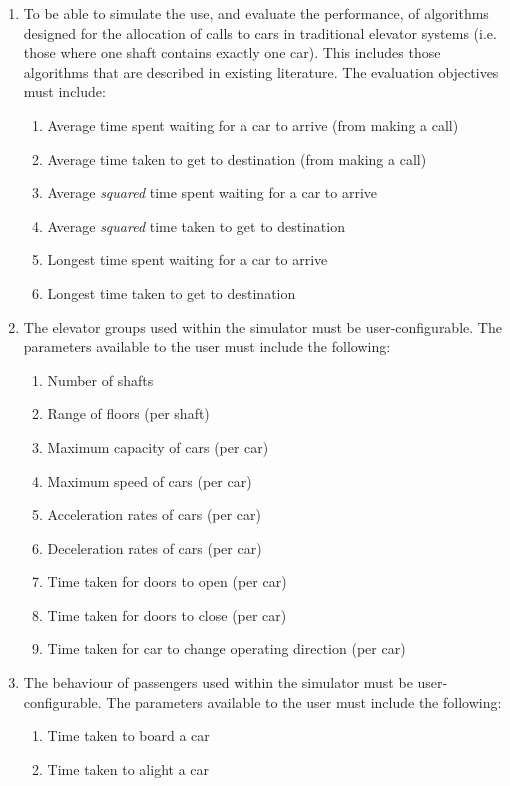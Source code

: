 \documentclass{UoYCSproject}
\begin{document}
	\begin{enumerate}
		\item To be able to simulate the use, and evaluate the performance, of algorithms designed for the allocation of calls to cars in traditional elevator systems (i.e. those where one shaft contains exactly one car).  This includes those algorithms that are described in existing literature.  The evaluation objectives must include:
		\begin{enumerate}
			\item Average time spent waiting for a car to arrive (from making a call)
			\item Average time taken to get to destination (from making a call)
			\item Average \textit{squared} time spent waiting for a car to arrive
			\item Average \textit{squared} time taken to get to destination
			\item Longest time spent waiting for a car to arrive
			\item Longest time taken to get to destination
		\end{enumerate}
		\item The elevator groups used within the simulator must be user-configurable.  The parameters available to the user must include the following:
		\begin{enumerate}
			\item Number of shafts
			\item Range of floors (per shaft)
			\item Maximum capacity of cars (per car)
			\item Maximum speed of cars (per car)
			\item Acceleration rates of cars (per car)
			\item Deceleration rates of cars (per car)
			\item Time taken for doors to open (per car)
			\item Time taken for doors to close (per car)
			\item Time taken for car to change operating direction (per car)
		\end{enumerate}
		\item The behaviour of passengers used within the simulator must be user-configurable.  The parameters available to the user must include the following:
		\begin{enumerate}
			\item Time taken to board a car
			\item Time taken to alight a car

\end{enumerate}
\end{enumerate}
\end{document}

